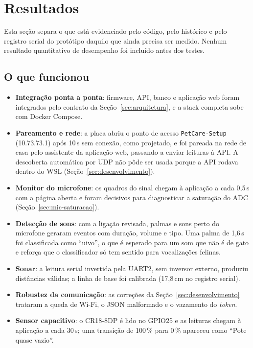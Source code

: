 \section{Resultados}
\label{sec:resultados}

Esta seção separa o que está evidenciado pelo código, pelo histórico e pelo registro serial do protótipo daquilo que ainda precisa ser medido. Nenhum resultado quantitativo de desempenho foi incluído antes dos testes.

\subsection{O que funcionou}

\begin{itemize}
  \item \textbf{Integração ponta a ponta}: firmware, API, banco e aplicação web foram integrados pelo contrato da Seção~\ref{sec:arquitetura}, e a stack completa sobe com Docker Compose.
  \item \textbf{Pareamento e rede}: a placa abriu o ponto de acesso \texttt{PetCare-Setup} (10.73.73.1) após 10\,s sem conexão, como projetado, e foi pareada na rede de casa pelo assistente da aplicação web, passando a enviar leituras à API. A descoberta automática por UDP não pôde ser usada porque a API rodava dentro do WSL (Seção~\ref{sec:desenvolvimento}). 
  \item \textbf{Monitor do microfone}: os quadros do sinal chegam à aplicação a cada 0,5\,s com a página aberta e foram decisivos para diagnosticar a saturação do ADC (Seção~\ref{sec:mic-saturacao}).
  \item \textbf{Detecção de sons}: com a ligação revisada, palmas e sons perto do microfone geraram eventos com duração, volume e tipo. Uma palma de 1,6\,s foi classificada como ``uivo'', o que é esperado para um som que não é de gato e reforça que o classificador só tem sentido para vocalizações felinas.
  \item \textbf{Sonar}: a leitura serial invertida pela UART2, sem inversor externo, produziu distâncias válidas; a linha de base foi calibrada (17,8\,cm no registro serial).
  \item \textbf{Robustez da comunicação}: as correções da Seção~\ref{sec:desenvolvimento} trataram a queda de Wi-Fi, o JSON malformado e o vazamento do \textit{token}.
  \item \textbf{Sensor capacitivo}: o CR18-8DP é lido no GPIO25 e as leituras chegam à aplicação a cada 30\,s; uma transição de 100\,\% para 0\,\% apareceu como ``Pote quase vazio''. 
\end{itemize}

